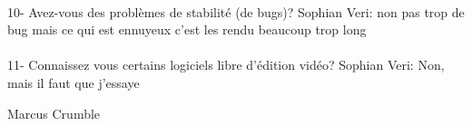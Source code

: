         \paragraph{}
          10- Avez-vous des problèmes de stabilité (de bugs)?
              Sophian Veri: non pas trop de bug mais ce qui est ennuyeux c'est les
              rendu beaucoup trop long

        \paragraph{}
          11- Connaissez vous certains logiciels libre d'édition vidéo?
              Sophian Veri: Non, mais il faut que j'essaye


Marcus Crumble
